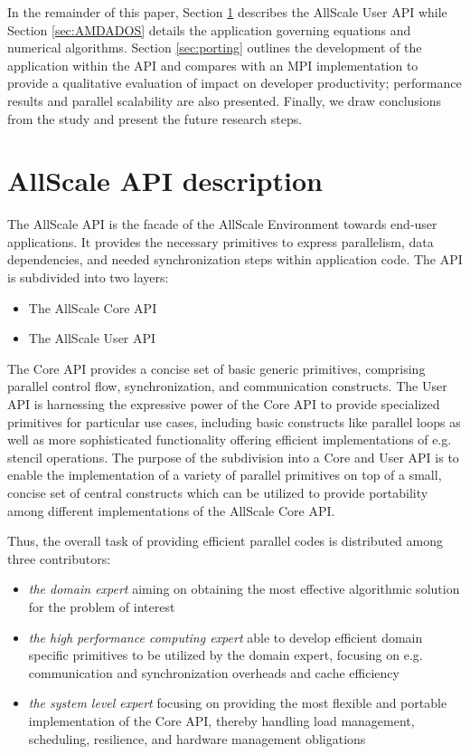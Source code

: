 \documentclass[conference,compsoc]{IEEEtran}
\begin{document}
In the remainder of this paper, Section \ref{sec:API} describes the AllScale User API while Section \ref{sec:AMDADOS} details the application governing equations and numerical algorithms. Section \ref{sec:porting} outlines the development of the application within the API and compares with an MPI implementation to provide a qualitative evaluation of impact on developer productivity; performance results and parallel scalability are also presented. Finally, we draw conclusions from the study and present the future research steps.

\section{AllScale API description}
\label{sec:API}
The AllScale API is the facade of the AllScale Environment towards end-user applications. It provides the necessary primitives to express parallelism, data dependencies, and needed synchronization steps within application code. The
API is subdivided into two layers:
\begin{itemize}
\item The AllScale Core API
\item The AllScale User API
\end{itemize}
The Core API provides a concise set of basic generic primitives, comprising
parallel control flow, synchronization, and communication constructs. The User
API is harnessing the expressive power of the Core API to provide specialized
primitives for particular use cases, including basic constructs like parallel loops
as well as more sophisticated functionality offering efficient implementations of
e.g. stencil operations.
The purpose of the subdivision into a Core and User API is to enable the
implementation of a variety of parallel primitives on top of a small, concise set of
central constructs which can be utilized to provide portability among different
implementations of the AllScale Core API.

Thus, the overall task of
providing efficient parallel codes is distributed among three contributors:
\begin{itemize}
\item \textit{the domain expert} aiming on obtaining the most effective algorithmic solution for the problem of interest
\item \textit{the high performance computing expert} able to develop efficient domain specific primitives to be utilized by the domain expert, focusing on e.g. communication and synchronization overheads and cache efficiency
\item \textit{the system level expert} focusing on providing the most flexible and portable implementation of the Core API, thereby handling load management, scheduling, resilience, and hardware management obligations
\end{itemize}
\end{document}
